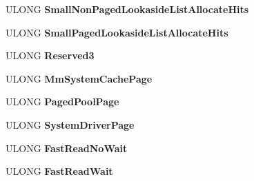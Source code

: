 \begin{DoxyCompactItemize}
U\+L\+O\+NG {\bfseries Small\+Non\+Paged\+Lookaside\+List\+Allocate\+Hits}
\item 
\mbox{\label{struct___s_y_s_t_e_m___p_e_r_f_o_r_m_a_n_c_e___i_n_f_o_r_m_a_t_i_o_n_a7a1069d371d66a0509774b835f50f6b0}} 
U\+L\+O\+NG {\bfseries Small\+Paged\+Lookaside\+List\+Allocate\+Hits}
\item 
\mbox{\label{struct___s_y_s_t_e_m___p_e_r_f_o_r_m_a_n_c_e___i_n_f_o_r_m_a_t_i_o_n_aa03b3b07332f9eab96951dc8b1f01170}} 
U\+L\+O\+NG {\bfseries Reserved3}
\item 
\mbox{\label{struct___s_y_s_t_e_m___p_e_r_f_o_r_m_a_n_c_e___i_n_f_o_r_m_a_t_i_o_n_a968ff246de6bd459dfd83bd13b8402a1}} 
U\+L\+O\+NG {\bfseries Mm\+System\+Cache\+Page}
\item 
\mbox{\label{struct___s_y_s_t_e_m___p_e_r_f_o_r_m_a_n_c_e___i_n_f_o_r_m_a_t_i_o_n_a010f3a4294834da92714d8d2cbcd0a0a}} 
U\+L\+O\+NG {\bfseries Paged\+Pool\+Page}
\item 
\mbox{\label{struct___s_y_s_t_e_m___p_e_r_f_o_r_m_a_n_c_e___i_n_f_o_r_m_a_t_i_o_n_a8286a5db47a13d047206943116632b3b}} 
U\+L\+O\+NG {\bfseries System\+Driver\+Page}
\item 
\mbox{\label{struct___s_y_s_t_e_m___p_e_r_f_o_r_m_a_n_c_e___i_n_f_o_r_m_a_t_i_o_n_a35354cabecd3b75765292e325356a775}} 
U\+L\+O\+NG {\bfseries Fast\+Read\+No\+Wait}
\item 
\mbox{\label{struct___s_y_s_t_e_m___p_e_r_f_o_r_m_a_n_c_e___i_n_f_o_r_m_a_t_i_o_n_afb00d8c4079590dc4cce73360e868b5c}} 
U\+L\+O\+NG {\bfseries Fast\+Read\+Wait}
\item 
\mbox{\label{struct___s_y_s_t_e_m___p_e_r_f_o_r_m_a_n_c_e___i_n_f_o_r_m_a_t_i_o_n_ad11b949ba325c5c6fd2672aaca1f3b4e}} 

\end{DoxyCompactItemize}
